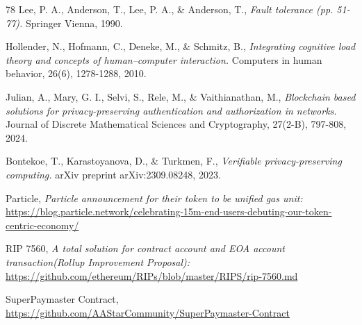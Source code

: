 \documentclass[preprint,12pt]{elsarticle}
\begin{document}
\begin{thebibliography}{78}
Lee, P. A., Anderson, T., Lee, P. A., \& Anderson, T.,
\textit{Fault tolerance (pp. 51-77).} Springer Vienna, 1990.

Hollender, N., Hofmann, C., Deneke, M., \& Schmitz, B.,
\textit{Integrating cognitive load theory and concepts of human–computer interaction.}
Computers in human behavior, 26(6), 1278-1288, 2010.

Julian, A., Mary, G. I., Selvi, S., Rele, M., \& Vaithianathan, M.,
\textit{Blockchain based solutions for privacy-preserving authentication and authorization in networks.}
Journal of Discrete Mathematical Sciences and Cryptography, 27(2-B), 797-808, 2024.

Bontekoe, T., Karastoyanova, D., \& Turkmen, F.,
\textit{Verifiable privacy-preserving computing.}
arXiv preprint arXiv:2309.08248, 2023.

Particle,
\textit{Particle announcement for their token to be unified gas unit:}
\url{https://blog.particle.network/celebrating-15m-end-users-debuting-our-token-centric-economy/}

RIP 7560,
\textit{A total solution for contract account and EOA account transaction(Rollup Improvement Proposal):}
\url{https://github.com/ethereum/RIPs/blob/master/RIPS/rip-7560.md}

SuperPaymaster Contract,
\url{https://github.com/AAStarCommunity/SuperPaymaster-Contract}


\end{thebibliography}
\end{document}
